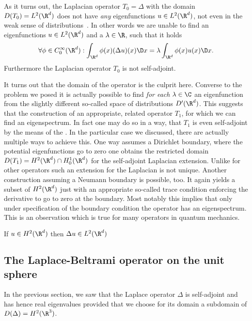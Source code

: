 As it turns out,
the Laplacian operator $T_0 = \Delta$ with the domain $D(T_0) = L^2(\R^d)$
does not have \emph{any}
eigenfunctions $u \in L^2(\R^d)$,
not even in the weak sense of distributions~\cite{Helffer2013}.
In other words we are unable to find an eigenfunctions $u \in L^2(\R^d)$
and a $\lambda \in \R$,
such that it holds
\[ \forall \phi \in C^\infty_0(\R^d):  \int_{\R^d}\phi(x) (\Delta u)(x) \D x = \lambda \int_{\R^d} \phi(x) u(x) \D x. \]
Furthermore the Laplacian operator $T_0$ is not self-adjoint.

It turns out that the domain of the operator is the culprit here.
Converse to the problem we posed it is actually possible
to find \emph{for each} $\lambda \in \C$ an eigenfunction from the
slightly different so-called space of distributions $D'(\R^d)$.
This suggests that the construction of an appropriate, related
operator $T_1$, for which we can find an eigenspectrum.
In fact one may do so in a way, that $T_1$ is even self-adjoint
by the means of the .
In the particular case we discussed, there are actually
multiple ways to achieve this.
One way assumes a Dirichlet boundary, where the potential
eigenfunctions go to zero
one obtains the restricted domain
$D(T_1) = H^2(\R^d) \cap H^1_0(\R^d)$
for the self-adjoint Laplacian extension.
Unlike for other operators such an extension for the Laplacian
is not unique.
Another construction assuming a Neumann boundary is possible, too.
It again yields a subset of $H^2(\R^d)$ just with an appropriate
so-called trace condition enforcing the derivative to go to zero
at the boundary.
Most notably this implies that only under specification
of the boundary condition the operator has an eigenspectrum.
This is an observation which is true for many operators in quantum mechanics.

If $u \in H^2(\R^d)$ then $\Delta u \in L^2(\R^d)$

\subsection{The Laplace-Beltrami operator on the unit sphere}
\label{sec:SpectrumLaplaceBeltrami}

In the previous section, we saw that the Laplace operator $\Delta$
is self-adjoint and has hence real eigenvalues provided that
we choose for its domain a subdomain of $D(\Delta) = H^2(\R^3)$.

